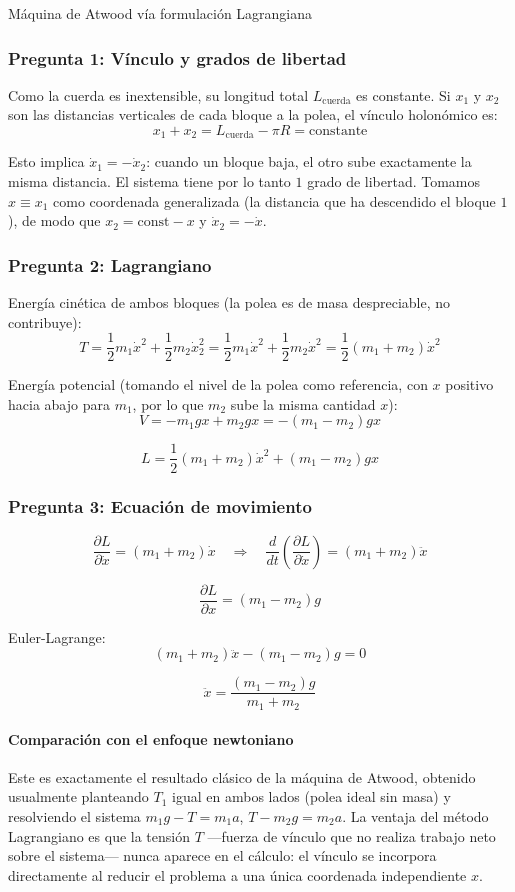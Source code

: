\begin{solucion}{Máquina de Atwood vía formulación Lagrangiana}
\subsubsection*{Pregunta 1: Vínculo y grados de libertad}

Como la cuerda es inextensible, su longitud total $L_{\text{cuerda}}$ es constante. Si $x_1$ y $x_2$ son las distancias verticales de cada bloque a la polea, el vínculo holonómico es:
$$x_1 + x_2 = L_{\text{cuerda}} - \pi R = \text{constante}$$

Esto implica $\dot{x}_1 = -\dot{x}_2$: cuando un bloque baja, el otro sube exactamente la misma distancia. El sistema tiene por lo tanto $1$ grado de libertad. Tomamos $x \equiv x_1$ como coordenada generalizada (la distancia que ha descendido el bloque $1$), de modo que $x_2 = \text{const} - x$ y $\dot{x}_2 = -\dot{x}$.

\subsubsection*{Pregunta 2: Lagrangiano}

Energía cinética de ambos bloques (la polea es de masa despreciable, no contribuye):
$$T = \frac{1}{2}m_1\dot{x}^2 + \frac{1}{2}m_2\dot{x}_2^2 = \frac{1}{2}m_1\dot{x}^2 + \frac{1}{2}m_2\dot{x}^2 = \frac{1}{2}(m_1+m_2)\dot{x}^2$$

Energía potencial (tomando el nivel de la polea como referencia, con $x$ positivo hacia abajo para $m_1$, por lo que $m_2$ sube la misma cantidad $x$):
$$V = -m_1gx + m_2gx = -(m_1-m_2)gx$$

$$\boxed{L = \frac{1}{2}(m_1+m_2)\dot{x}^2 + (m_1-m_2)gx}$$

\subsubsection*{Pregunta 3: Ecuación de movimiento}

$$\frac{\partial L}{\partial\dot{x}} = (m_1+m_2)\dot{x} \quad\Rightarrow\quad \frac{d}{dt}\left(\frac{\partial L}{\partial\dot{x}}\right) = (m_1+m_2)\ddot{x}$$

$$\frac{\partial L}{\partial x} = (m_1-m_2)g$$

Euler-Lagrange:
$$(m_1+m_2)\ddot{x} - (m_1-m_2)g = 0$$

$$\boxed{\ddot{x} = \frac{(m_1-m_2)g}{m_1+m_2}}$$

\paragraph{Comparación con el enfoque newtoniano} Este es exactamente el resultado clásico de la máquina de Atwood, obtenido usualmente planteando $T_1$ igual en ambos lados (polea ideal sin masa) y resolviendo el sistema $m_1g - T = m_1a$, $T - m_2g = m_2a$. La ventaja del método Lagrangiano es que la tensión $T$ —fuerza de vínculo que no realiza trabajo neto sobre el sistema— nunca aparece en el cálculo: el vínculo se incorpora directamente al reducir el problema a una única coordenada independiente $x$.
\end{solucion}
